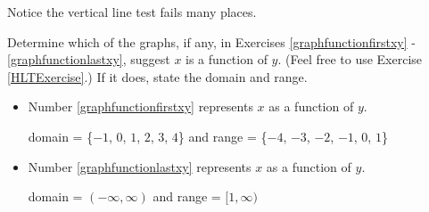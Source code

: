 \documentclass{ximera}
\begin{document}
 
\begin{problem}\label{graphfunctionlastxy}

    \begin{center}
\end{center}

\begin{multipleChoice}
    \begin{feedback}
       Notice the vertical line test fails many places. 
    \end{feedback}
\end{multipleChoice}
\end{problem} 





\begin{problem}
    Determine which of the graphs, if any, in Exercises \ref{graphfunctionfirstxy} - \ref{graphfunctionlastxy}, suggest $x$ is a function of $y$.  (Feel free to use Exercise \ref{HLTExercise}.)  If it does, state the domain and range.

\begin{solution}
\begin{itemize}

\item Number \ref{graphfunctionfirstxy} represents $x$ as a function of $y$.

domain  = \{$-1$, $0$, $1$, $2$, $3$, $4$\} and range = \{$-4$, $-3$, $-2$, $-1$, $0$, $1$\}

\item Number \ref{graphfunctionlastxy} represents $x$ as a function of $y$.

domain = $(-\infty, \infty)$  and range = $[1, \infty)$


\end{itemize}
\end{solution}
\end{problem}
\end{document}
